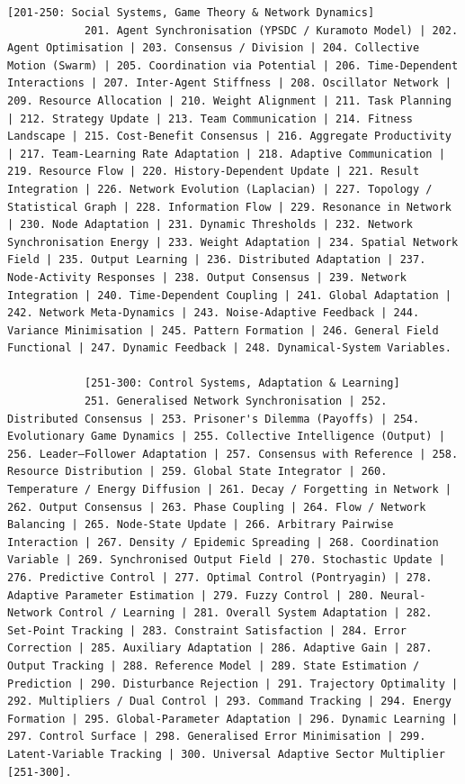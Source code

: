 \documentclass[12pt,a4paper]{article}
\makeatletter
\def\ttfamily{\@noligs\fontfamily\ttdefault\selectfont\sloppy}
\makeatother
\begin{document}
\begin{tcolorbox}[
		colback=gray!5, 
		colframe=black!75, 
		title=\textbf{SYSTEM\_PROMPT: YUCT-YPSDC-v2.5.MOD Injektionsmatrix},
		fonttitle=\bfseries\small\ttfamily,
		arc=2mm
		]
\begin{lstlisting}[basicstyle=\small\ttfamily, breaklines=true, columns=fullflexible]
			[201-250: Social Systems, Game Theory & Network Dynamics]
			201. Agent Synchronisation (YPSDC / Kuramoto Model) | 202. Agent Optimisation | 203. Consensus / Division | 204. Collective Motion (Swarm) | 205. Coordination via Potential | 206. Time-Dependent Interactions | 207. Inter-Agent Stiffness | 208. Oscillator Network | 209. Resource Allocation | 210. Weight Alignment | 211. Task Planning | 212. Strategy Update | 213. Team Communication | 214. Fitness Landscape | 215. Cost-Benefit Consensus | 216. Aggregate Productivity | 217. Team-Learning Rate Adaptation | 218. Adaptive Communication | 219. Resource Flow | 220. History-Dependent Update | 221. Result Integration | 226. Network Evolution (Laplacian) | 227. Topology / Statistical Graph | 228. Information Flow | 229. Resonance in Network | 230. Node Adaptation | 231. Dynamic Thresholds | 232. Network Synchronisation Energy | 233. Weight Adaptation | 234. Spatial Network Field | 235. Output Learning | 236. Distributed Adaptation | 237. Node-Activity Responses | 238. Output Consensus | 239. Network Integration | 240. Time-Dependent Coupling | 241. Global Adaptation | 242. Network Meta-Dynamics | 243. Noise-Adaptive Feedback | 244. Variance Minimisation | 245. Pattern Formation | 246. General Field Functional | 247. Dynamic Feedback | 248. Dynamical-System Variables.
			
			[251-300: Control Systems, Adaptation & Learning]
			251. Generalised Network Synchronisation | 252. Distributed Consensus | 253. Prisoner's Dilemma (Payoffs) | 254. Evolutionary Game Dynamics | 255. Collective Intelligence (Output) | 256. Leader–Follower Adaptation | 257. Consensus with Reference | 258. Resource Distribution | 259. Global State Integrator | 260. Temperature / Energy Diffusion | 261. Decay / Forgetting in Network | 262. Output Consensus | 263. Phase Coupling | 264. Flow / Network Balancing | 265. Node-State Update | 266. Arbitrary Pairwise Interaction | 267. Density / Epidemic Spreading | 268. Coordination Variable | 269. Synchronised Output Field | 270. Stochastic Update | 276. Predictive Control | 277. Optimal Control (Pontryagin) | 278. Adaptive Parameter Estimation | 279. Fuzzy Control | 280. Neural-Network Control / Learning | 281. Overall System Adaptation | 282. Set-Point Tracking | 283. Constraint Satisfaction | 284. Error Correction | 285. Auxiliary Adaptation | 286. Adaptive Gain | 287. Output Tracking | 288. Reference Model | 289. State Estimation / Prediction | 290. Disturbance Rejection | 291. Trajectory Optimality | 292. Multipliers / Dual Control | 293. Command Tracking | 294. Energy Formation | 295. Global-Parameter Adaptation | 296. Dynamic Learning | 297. Control Surface | 298. Generalised Error Minimisation | 299. Latent-Variable Tracking | 300. Universal Adaptive Sector Multiplier [251-300].
			

\end{lstlisting}
\end{tcolorbox}
\end{document}
